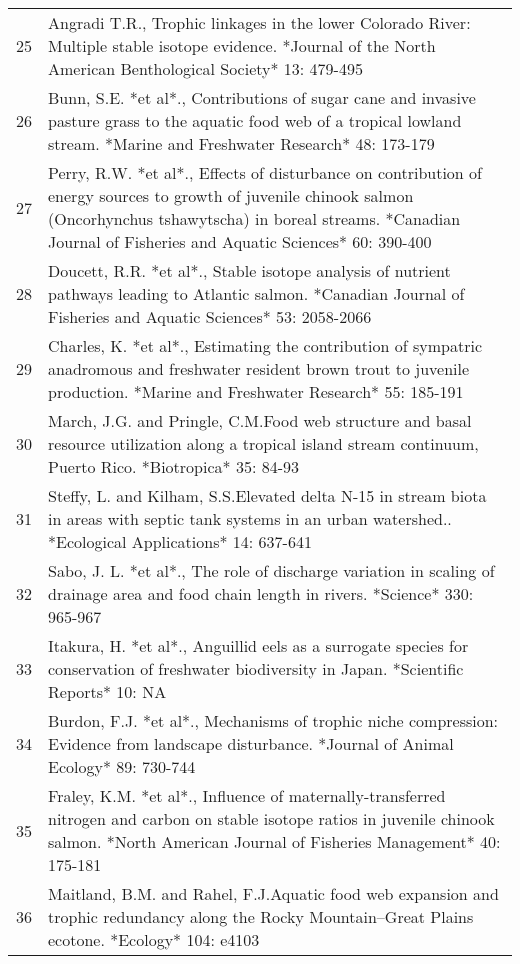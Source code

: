 \begin{table}[ht]
\begin{tabularx}{\textwidth}{rl}
   25 & Angradi T.R., Trophic linkages in the lower Colorado River: Multiple stable isotope evidence. *Journal of the North American Benthological Society* 13: 479-495 \\ 
   26 & Bunn, S.E. *et al*., Contributions of sugar cane and invasive pasture grass to the aquatic food web of a tropical lowland stream. *Marine and Freshwater Research* 48: 173-179 \\ 
   27 & Perry, R.W. *et al*., Effects of disturbance on contribution of energy sources to growth of juvenile chinook salmon (Oncorhynchus tshawytscha) in boreal streams. *Canadian Journal of Fisheries and Aquatic Sciences* 60: 390-400 \\ 
   28 & Doucett, R.R. *et al*., Stable isotope analysis of nutrient pathways leading to Atlantic salmon. *Canadian Journal of Fisheries and Aquatic Sciences* 53: 2058-2066 \\ 
   29 & Charles, K. *et al*., Estimating the contribution of sympatric anadromous and freshwater resident brown trout to juvenile production. *Marine and Freshwater Research* 55: 185-191 \\ 
   30 & March, J.G. and Pringle, C.M.Food web structure and basal resource utilization along a tropical island stream continuum, Puerto Rico. *Biotropica* 35: 84-93 \\ 
   31 & Steffy, L. and Kilham, S.S.Elevated delta N-15 in stream biota in areas with septic tank systems in an urban watershed.. *Ecological Applications* 14: 637-641 \\ 
   32 & Sabo, J. L. *et al*., The role of discharge variation in scaling of drainage area and food chain length in rivers. *Science* 330: 965-967 \\ 
   33 & Itakura, H. *et al*., Anguillid eels as a surrogate species for conservation of freshwater biodiversity in Japan. *Scientific Reports* 10: NA \\ 
   34 & Burdon, F.J. *et al*., Mechanisms of trophic niche compression: Evidence from landscape disturbance. *Journal of Animal Ecology* 89: 730-744 \\ 
   35 & Fraley, K.M. *et al*., Influence of maternally-transferred nitrogen and carbon on stable isotope ratios in juvenile chinook salmon. *North American Journal of Fisheries Management* 40: 175-181 \\ 
   36 & Maitland, B.M. and Rahel, F.J.Aquatic food web expansion and trophic redundancy along the Rocky Mountain–Great Plains ecotone. *Ecology* 104: e4103 \\ 

\end{tabularx}
\end{table}
